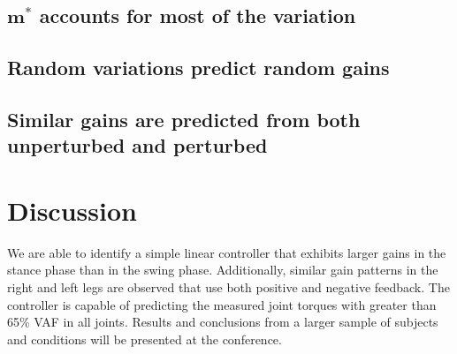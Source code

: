 \documentclass{article}
\begin{document}
\subsection{$\mathbf{m}^*$ accounts for most of the variation}
%
\subsection{Random variations predict random gains}
%
\subsection{Similar gains are predicted from both unperturbed and perturbed}
%
\section*{Discussion}
%
We are able to identify a simple linear controller that exhibits larger gains
in the stance phase than in the swing phase. Additionally, similar gain
patterns in the right and left legs are observed that use both positive and
negative feedback. The controller is capable of predicting the measured joint
torques with greater than 65\% VAF in all joints. Results and conclusions from
a larger sample of subjects and conditions will be presented at the conference.


%
\end{document}
